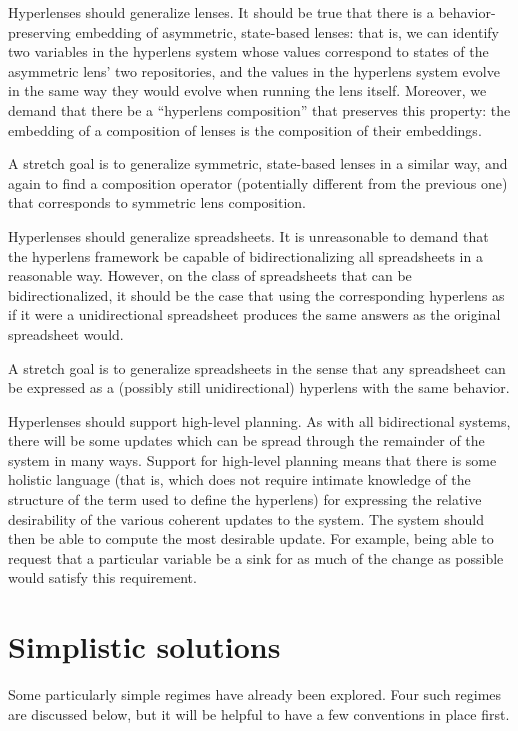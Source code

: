Hyperlenses should generalize lenses. It should be true that there is a
behavior-preserving embedding of asymmetric, state-based lenses: that is, we
can identify two variables in the hyperlens system whose values correspond
to states of the asymmetric lens' two repositories, and the values in the
hyperlens system evolve in the same way they would evolve when running the
lens itself. Moreover, we demand that there be a ``hyperlens composition''
that preserves this property: the embedding of a composition of lenses is
the composition of their embeddings.

A stretch goal is to generalize symmetric, state-based lenses in a similar
way, and again to find a composition operator (potentially different from
the previous one) that corresponds to symmetric lens composition.

Hyperlenses should generalize spreadsheets. It is unreasonable to demand
that the hyperlens framework be capable of bidirectionalizing all
spreadsheets in a reasonable way. However, on the class of spreadsheets that
can be bidirectionalized, it should be the case that using the corresponding
hyperlens as if it were a unidirectional spreadsheet produces the same
answers as the original spreadsheet would.

A stretch goal is to generalize spreadsheets in the sense that any
spreadsheet can be expressed as a (possibly still unidirectional) hyperlens
with the same behavior.

Hyperlenses should support high-level planning. As with all bidirectional
systems, there will be some updates which can be spread through the
remainder of the system in many ways. Support for high-level planning means
that there is some holistic language (that is, which does not require
intimate knowledge of the structure of the term used to define the
hyperlens) for expressing the relative desirability of the various coherent
updates to the system. The system should then be able to compute the most
desirable update. For example, being able to request that a particular
variable be a sink for as much of the change as possible would satisfy this
requirement.

\section{Simplistic solutions}
Some particularly simple regimes have already been explored. Four such
regimes are discussed below, but it will be helpful to have a few
conventions in place first.

